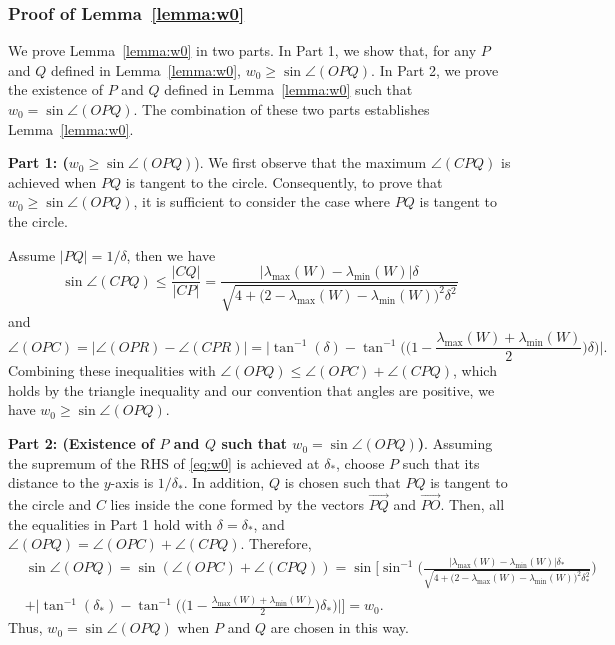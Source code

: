 \documentclass[11pt]{article}
\begin{document}
{\subsubsection{Proof of Lemma~\ref{lemma:w0}}\label{sec:proof_lemma_w0}
We prove Lemma~\ref{lemma:w0} in two parts. In Part 1, we show that, for any $P$ and $Q$ defined in Lemma~\ref{lemma:w0}, $w_0 \geq \sin\angle(OPQ)$. In Part 2, we prove the existence of $P$ and $Q$ defined in Lemma~\ref{lemma:w0} such that $w_0 = \sin\angle(OPQ)$. The combination of these two parts establishes Lemma~\ref{lemma:w0}.

\vspace{0.1in}
\textbf{Part 1: ($w_0\geq \sin\angle(OPQ)$}). We first observe that the maximum $\angle (CPQ)$ is achieved when $PQ$ is tangent to the circle. Consequently, to prove that $w_0\geq \sin\angle(OPQ)$, it is sufficient to consider the case where $PQ$ is tangent to the circle.

Assume $|PQ|=1/\delta$, then we have
\[
\sin\angle (CPQ)\leq \frac{|CQ|}{|CP|}= \!\frac{|\lambda_{\max}(W)-\lambda_{\min}(W)|\delta}{\sqrt{\!4+\!\big(2\!-\!\lambda_{\max}(\!W\!)\!-\!\lambda_{\min}(W\!)\big)^2\!\delta^2}}
\]
and 
\[
\angle (OPC) = |\angle (OPR)-\angle (CPR)|= \Big|\tan^{-1}(\delta)-\tan^{-1}\Big(\big(1-\frac{\lambda_{\max}(W)+\lambda_{\min}(W)}{2}\big)\delta\Big)\Big|.
\]
Combining these inequalities with $\angle(OPQ)\leq \angle(OPC)+\angle(CPQ)$, which holds by the triangle inequality and our convention that angles are positive, we have $w_0\geq \sin\angle(OPQ)$.

\vspace{0.1in}
\textbf{Part 2: (Existence of $P$ and $Q$ such that $w_0 = \sin\angle(OPQ)$)}.
Assuming the supremum of the RHS of \eqref{eq:w0} is achieved at $\delta_*$, choose $P$ such that its distance to the $y$-axis is $1/\delta_*$. In addition, $Q$ is chosen such that $PQ$ is tangent to the circle and $C$ lies inside the cone formed by the vectors $\vec{PQ}$ and $\vec{PO}$. Then, all the equalities in Part 1 hold with $\delta=\delta_*$, and $\angle(OPQ)= \angle(OPC)+\angle(CPQ)$. Therefore,   
\begin{align*}
&\sin\angle(OPQ)\!=\! \sin(\angle(OPC)\!+\!\angle(CPQ))\!=\!\sin\!\Bigg[\!
\sin^{-1}\!\!\Big(\!\frac{|\lambda_{\max}(W)-\lambda_{\min}(W)|\delta_*}{\sqrt{\!4+\!\big(2\!-\!\lambda_{\max}(\!W\!)\!-\!\lambda_{\min}(W\!)\big)^2\!\delta_*^2}}\!\Big)\! \\
&+ \Big|\tan^{-1}(\delta_*)-\tan^{-1}\Big(\big(1-\frac{\lambda_{\max}(W)+\lambda_{\min}(W)}{2}\big)\delta_*\Big)\Big|\Bigg]=w_0.
\end{align*}
Thus, $w_0=\sin\angle(OPQ)$ when $P$ and $Q$ are chosen in this way. 

}
\end{document}
